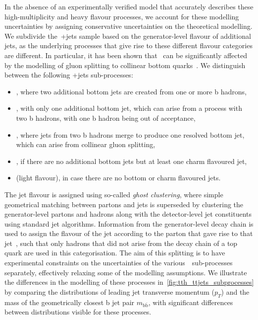 In the absence of an experimentally verified model that accurately describes these high-multiplicity and heavy flavour processes, we account for these modelling uncertainties by assigning conservative uncertainties on the theoretical modelling. We subdivide the~\ttbar+jets sample based on the generator-level flavour of additional jets, as the underlying processes that give rise to these different flavour categories are different. In particular, it has been shown that \ttbb~can be significantly affected by the modelling of gluon splitting to collinear bottom quarks~\cite{Cascioli:2013era}. We distinguish between the following \ttbar+jets sub-processes:
\begin{itemize}
\item \ttbb, where two additional bottom jets are created from one or more b hadrons,
\item \ttb, with only one additional bottom jet, which can arise from a process with two b hadrons, with one b hadron being out of acceptance,
\item \tttwob, where jets from two b hadrons merge to produce one resolved bottom jet, which can arise from collinear gluon splitting,
\item \ttcc, if there are no additional bottom jets but at least one charm flavoured jet,
\item \ttlf (light flavour), in case there are no bottom or charm flavoured jets.
\end{itemize}
The jet flavour is assigned using so-called \textit{ghost clustering}, where simple geometrical matching between partons and jets is superseded by clustering the generator-level partons and hadrons along with the detector-level jet constituents using standard jet algorithms. Information from the generator-level decay chain is used to assign the flavour of the jet according to the parton that gave rise to that jet~\cite{Bartosik:2047049}, such that only hadrons that did not arise from the decay chain of a top quark are used in this categorisation. The aim of this splitting is to have experimental constraints on the uncertainties of the various~\ttbar~sub-processes separately, effectively relaxing some of the modelling assumptions. We illustrate the differences in the modelling of these processes in~\cref{fig:tth_ttjets_subprocesses} by comparing the distributions of leading jet transverse momentum ($p_T$) and the mass of the geometrically closest b jet pair $m_{\mathrm{b\bar{b}}}$, with significant differences between distributions visible for these processes.


